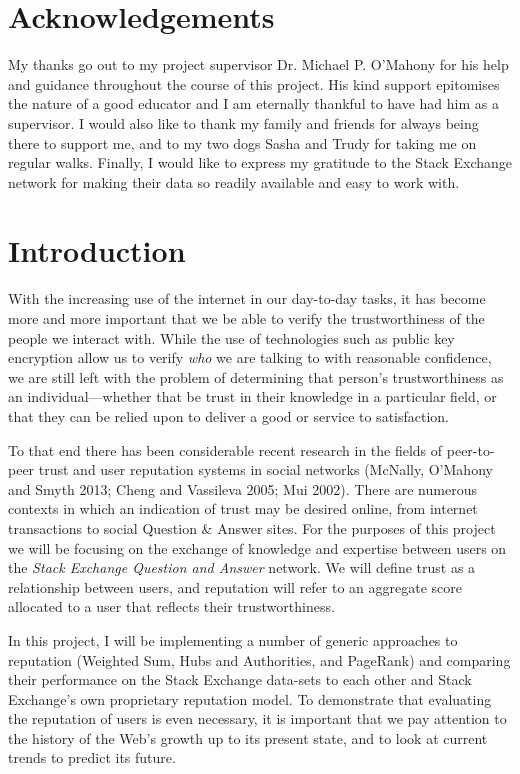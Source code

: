 \documentclass[]{final_report}
\begin{document}
\chapter*{Acknowledgements}

My thanks go out to my project supervisor Dr. Michael P. O'Mahony  for his help and guidance throughout the course of this project. His kind support epitomises the nature of a good educator and I am eternally thankful to have had him as a supervisor. I would also like to thank my family and friends for always being there to support me, and to my two dogs Sasha and Trudy for taking me on regular walks. Finally, I would like to express my gratitude to the Stack Exchange network for making their data so readily available and easy to work with.

\tableofcontents{}\newpage


\chapter{Introduction}

With the increasing use of the internet in our day-to-day tasks, it has become more and more important that we be able to verify the trustworthiness of the people we interact with. While the use of technologies such as public key encryption allow us to verify \textsl{who} we are talking to with reasonable confidence, we are still left with the problem of determining that person's trustworthiness as an individual---whether that be trust in their knowledge in a particular field, or that they can be relied upon to deliver a good or service to satisfaction.

To that end there has been considerable recent research in the fields of peer-to-peer trust and user reputation systems in social networks (McNally, O'Mahony and Smyth 2013; Cheng and Vassileva 2005; Mui 2002). There are numerous contexts in which an indication of trust may be desired online, from internet transactions to social Question \& Answer sites. For the purposes of this project we will be focusing on the exchange of knowledge and expertise between users on the \textsl{Stack Exchange Question and Answer} network. We will define trust as a relationship between users, and reputation will refer to an aggregate score allocated to a user that reflects their trustworthiness.

In this project, I will be implementing a number of generic approaches to reputation (Weighted Sum, Hubs and Authorities, and PageRank) and comparing their performance on the Stack Exchange data-sets to each other and Stack Exchange's own proprietary reputation model. To demonstrate that evaluating the reputation of users is even necessary, it is important that we pay attention to the history of the Web's growth up to its present state, and to look at current trends to predict its future.
\end{document}
